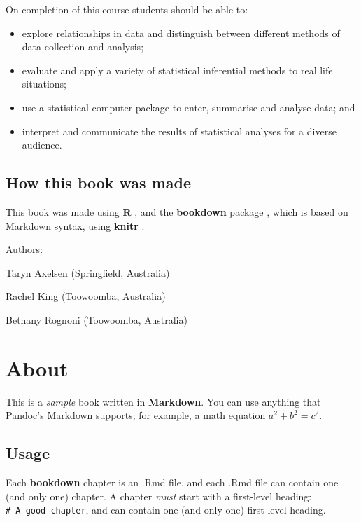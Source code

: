 \documentclass[
]{book}
\begin{document}
On completion of this course students should be able to:

\begin{itemize}
\item
  explore relationships in data and distinguish between different methods of
  data collection and analysis;
\item
  evaluate and apply a variety of statistical inferential methods to real life situations;
\item
  use a statistical computer package to enter, summarise and analyse data; and
\item
  interpret and communicate the results of statistical analyses for a diverse audience.
\end{itemize}

\section*{How this book was made}\label{how-this-book-was-made}

This book was made using \textbf{R} \citep{R-base}, and the \textbf{bookdown} package \citep{R-bookdown}, which is based on \href{https://en.wikipedia.org/wiki/Markdown}{Markdown} syntax, using \textbf{knitr} \citep{R-knitr}.

\begin{flushright}
Authors:

Taryn Axelsen (Springfield, Australia)

Rachel King (Toowoomba, Australia)

Bethany Rognoni (Toowoomba, Australia)
\end{flushright}

\mainmatter

\chapter*{About}\label{about}

This is a \emph{sample} book written in \textbf{Markdown}. You can use anything that Pandoc's Markdown supports; for example, a math equation \(a^2 + b^2 = c^2\).

\section*{Usage}\label{usage}

Each \textbf{bookdown} chapter is an .Rmd file, and each .Rmd file can contain one (and only one) chapter. A chapter \emph{must} start with a first-level heading: \texttt{\#\ A\ good\ chapter}, and can contain one (and only one) first-level heading.
\end{document}
